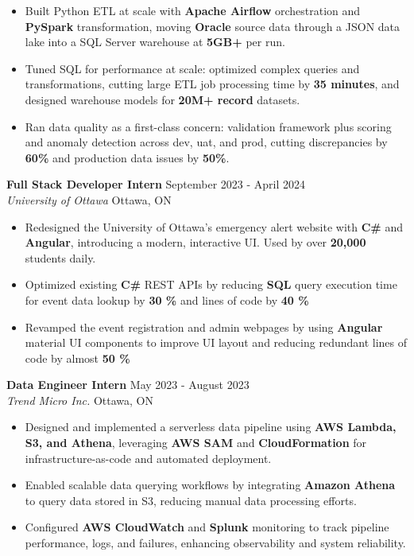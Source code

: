 \documentclass[a4paper]{article}
\begin{document}
\begin{itemize}
\item Built Python ETL at scale with \textbf{Apache Airflow} orchestration and \textbf{PySpark} transformation, moving \textbf{Oracle} source data through a JSON data lake into a SQL Server warehouse at \textbf{5GB+} per run.

\item Tuned SQL for performance at scale: optimized complex queries and transformations, cutting large ETL job processing time by \textbf{35 minutes}, and designed warehouse models for \textbf{20M+ record} datasets.

\item Ran data quality as a first-class concern: validation framework plus scoring and anomaly detection across dev, uat, and prod, cutting discrepancies by \textbf{60\%} and production data issues by \textbf{50\%}.

\end{itemize}

\textbf{Full Stack Developer Intern } \hfill September 2023 - April 2024\\
\textit{University of Ottawa} \hfill Ottawa, ON\\
\vspace{-2mm}
\begin{itemize} \itemsep -4pt \topsep 0pt
    \item Redesigned the University of Ottawa's emergency alert website with \textbf{C\#} and \textbf{Angular}, introducing a modern, interactive UI. Used by over \textbf{20,000} students daily.
     \item Optimized existing \textbf{C\#} REST APIs by reducing \textbf{SQL} query execution time for event data lookup by \textbf{30 \%} and lines of code by \textbf{40 \%}
    \item Revamped the event registration and admin webpages by using \textbf{Angular} material UI components to improve UI layout and reducing redundant lines of code by almost \textbf{50 \%}
\end{itemize}

\textbf{Data Engineer Intern} \hfill May 2023 - August 2023\\
\textit{Trend Micro Inc.} \hfill Ottawa, ON\\
\vspace{-2mm}
\begin{itemize} \itemsep -4pt \topsep 0pt

\item Designed and implemented a serverless data pipeline using \textbf{AWS Lambda, S3, and Athena}, leveraging \textbf{AWS SAM} and \textbf{CloudFormation} for infrastructure-as-code and automated deployment.

\item Enabled scalable data querying workflows by integrating \textbf{Amazon Athena} to query data stored in S3, reducing manual data processing efforts.

\item Configured \textbf{AWS CloudWatch} and \textbf{Splunk} monitoring to track pipeline performance, logs, and failures, enhancing observability and system reliability.

\end{itemize}
\end{document}
